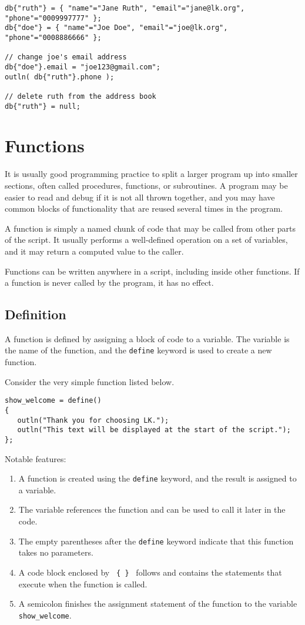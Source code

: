 \documentclass{article}
\begin{document}
\begin{verbatim}
db{"ruth"} = { "name"="Jane Ruth", "email"="jane@lk.org", "phone"="0009997777" };
db{"doe"} = { "name"="Joe Doe", "email"="joe@lk.org", "phone"="0008886666" };

// change joe's email address
db{"doe"}.email = "joe123@gmail.com";
outln( db{"ruth"}.phone );

// delete ruth from the address book
db{"ruth"} = null;

\end{verbatim}

\section{Functions}

It is usually good programming practice to split a larger program up into smaller sections, often called procedures, functions, or subroutines.  A program may be easier to read and debug if it is not all thrown together, and you may have common blocks of functionality that are reused several times in the program.

A function is simply a named chunk of code that may be called from other parts of the script.  It usually performs a well-defined operation on a set of variables, and it may return a computed value to the caller.

Functions can be written anywhere in a script, including inside other functions.  If a function is never called by the program, it has no effect.

\subsection{Definition}

A function is defined by assigning a block of code to a variable.  The variable is the name of the function, and the \texttt{define} keyword is used to create a new function.

Consider the very simple function listed below.

\begin{verbatim}
show_welcome = define()
{
   outln("Thank you for choosing LK.");
   outln("This text will be displayed at the start of the script.");
};
\end{verbatim}

Notable features:
\begin{enumerate}
\item A function is created using the \texttt{define} keyword, and the result is assigned to a variable.
\item The variable references the function and can be used to call it later in the code.
\item The empty parentheses after the \texttt{define} keyword indicate that this function takes no parameters.
\item A code block enclosed by \texttt{ \{ \} } follows and contains the statements that execute when the function is called.
\item A semicolon finishes the assignment statement of the function to the variable \texttt{show\_welcome}.
\end{enumerate}
\end{document}
